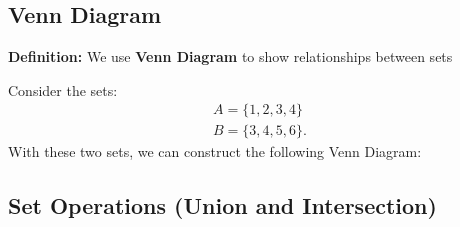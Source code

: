 \documentclass{report}
\begin{document}
    \pagebreak \bigbreak \noindent
    \subsection{Venn Diagram}
    \smallbreak \noindent
    \begin{mdframed}
        \textbf{Definition:}
         We use \textbf{Venn Diagram} to show relationships between sets
    \end{mdframed}
    \bigbreak \noindent 
    Consider the sets:
    \begin{align*}
        A = \{1,2,3,4\} \\
        B = \{3,4,5,6\}
    .\end{align*}
    With these two sets, we can construct the following Venn Diagram:
    \begin{figure}[ht]
        \centering
        \label{fig:venn}
    \end{figure}

    \bigbreak \noindent \bigbreak \noindent 
    \subsection{Set Operations (Union and Intersection)}
    \bigbreak \noindent 



    



    
\end{document}
